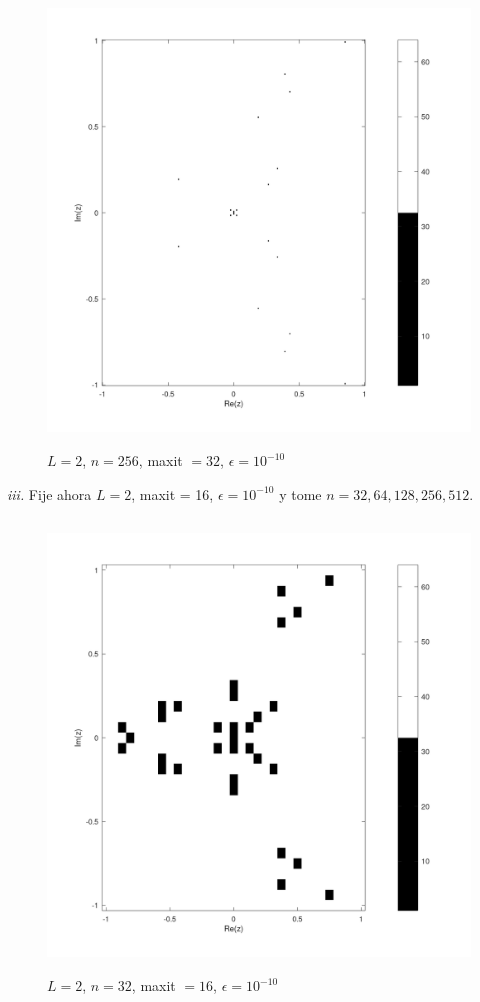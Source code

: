 \documentclass{article} %
\begin{document}
\begin{figure}[H]
    \centering
    \includegraphics[width=152mm, height=120mm]{images/L2n256maxit32e10-10.png}
    \caption{$L=2$, $n=256$, maxit $=32$, $\epsilon=10^{-10}$}
\end{figure}

\textit{iii.} Fije ahora $L=2$, maxit = 16,  $\epsilon=10^{-10}$ y tome $n=32,64,128,256,512$.

\begin{figure}[H]
    \centering
    \includegraphics[width=152mm, height=120mm]{images/L2n32maxit16e10-10.png}
    \caption{$L=2$, $n=32$, maxit $=16$, $\epsilon=10^{-10}$}
\end{figure}
\end{document}

